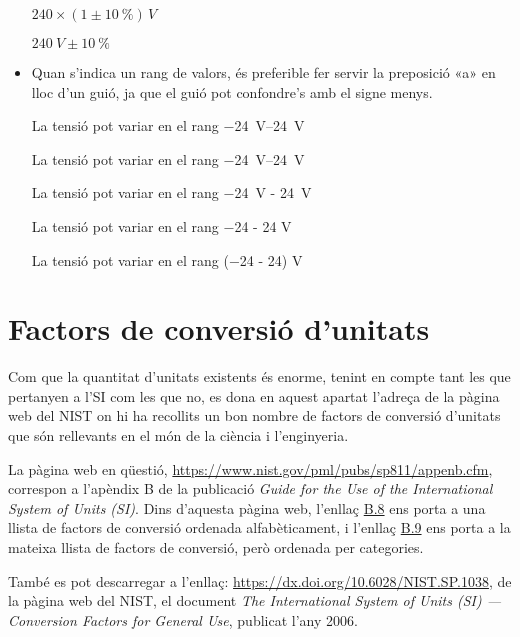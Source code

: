 \begin{itemize}
\textcolor{Green}\faCheckSquare{} $240 \times (1 \pm \qty{10}{\percent})\unit{\,V}$

\textcolor{Blue}\faExclamationTriangle{}  $\qty{240}{V} \pm \qty{10}{\percent}$


\item Quan s'indica un rang de valors, és preferible fer servir la preposició «a» en lloc d'un guió, ja que el guió pot confondre's amb el signe menys.

\textcolor{Green}\faCheckSquare{} La tensió pot variar en el rang \qtyrange{-24}{24}{V}

\textcolor{Green}\faCheckSquare{} La tensió pot variar en el rang \qtyrange[range-units = bracket]{-24}{24}{V}

\textcolor{Blue}\faExclamationTriangle{}  La tensió pot variar en el rang \qty{-24}{V} - \qty{24}{V}

\textcolor{Blue}\faExclamationTriangle{} La tensió pot variar en el rang \num{-24} - 24 V 

\textcolor{Blue}\faExclamationTriangle{} La tensió pot variar en el rang (\num{-24} - 24) V 

\end{itemize}


\section{Factors de conversió d'unitats}\label{sec:SI-fact-conv}
Com que la quantitat d'unitats existents és enorme, tenint en compte tant les que pertanyen a l'SI com les que no, es dona en aquest apartat l'adreça de la pàgina web del NIST on hi ha recollits un bon nombre de factors de conversió d'unitats que són rellevants en el món de la ciència i l'enginyeria.

La pàgina web en  qüestió, \href{https://www.nist.gov/pml/pubs/sp811/appenb.cfm}{https://www.nist.gov/pml/pubs/sp811/appenb.cfm}, correspon a l'apèndix B de la publicació \textit{Guide for the Use of the International System of Units (SI)}.
Dins d'aquesta pàgina web, l'enllaç \href{https://www.nist.gov/pml/pubs/sp811/appenb8.cfm}{B.8} ens porta a una llista de factors de conversió ordenada alfabèticament, i l'enllaç  \href{https://www.nist.gov/pml/pubs/sp811/appenb9.cfm}{B.9} ens porta a la mateixa llista de factors de conversió, però ordenada per categories.

També es pot descarregar a l'enllaç: \href{https://dx.doi.org/10.6028/NIST.SP.1038}{https://dx.doi.org/10.6028/NIST.SP.1038}, de la pàgina web del NIST, el document \textit{The International System of Units (SI) --- Conversion Factors
for General Use}, publicat l'any 2006.
